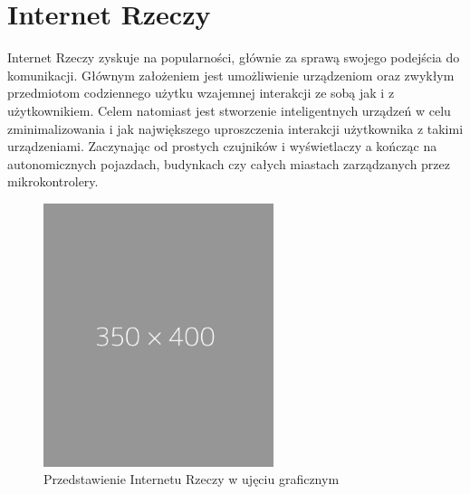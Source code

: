 \documentclass[12pt]{report}
\let\Oldsection\section
\renewcommand{\section}{\FloatBarrier\Oldsection}
\begin{document}
\section{Internet Rzeczy}
Internet Rzeczy zyskuje na popularności, głównie za sprawą swojego podejścia do komunikacji. Głównym założeniem jest umożliwienie urządzeniom oraz zwykłym przedmiotom codziennego użytku wzajemnej interakcji ze sobą jak i z użytkownikiem. Celem natomiast jest stworzenie inteligentnych urządzeń w celu zminimalizowania i jak największego uproszczenia interakcji użytkownika z takimi urządzeniami. Zaczynając od prostych czujników i wyświetlaczy a kończąc na autonomicznych pojazdach, budynkach czy całych miastach zarządzanych przez mikrokontrolery. 

\begin{figure}[h]
	\centering
	\includegraphics[width=0.6\textwidth]{images/placeholder.png}
	\caption{Przedstawienie Internetu Rzeczy w ujęciu graficznym}
\end{figure}
\end{document}
